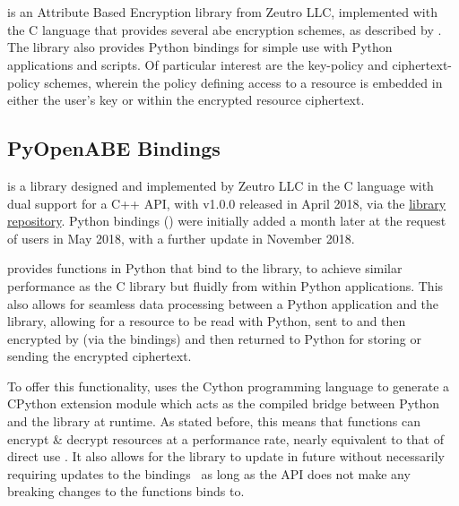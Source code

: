 \section{\OpenABE}
\label{sec:bkgr_openabe}

\OpenABE is an Attribute Based Encryption library from Zeutro LLC, implemented with the C language that provides several \acrshort{abe} encryption schemes, as described by \citet{Akinyele2011}. The library also provides Python bindings for simple use with Python applications and scripts. Of particular interest are the key-policy and ciphertext-policy schemes, wherein the policy defining access to a resource is embedded in either the user's key or within the encrypted resource ciphertext.

\subsection{PyOpenABE Bindings}
\label{subsec:bkgr_pyopenabe}

\OpenABE is a library designed and implemented by Zeutro LLC in the C language with dual support for a C++ API, with v1.0.0 released in April 2018, via the \href{https://github.com/zeutro/openabe/releases}{\OpenABE library repository}. Python bindings (\PyOpenABE) were initially added a month later at the request of users in May 2018, with a further update in November 2018.

\PyOpenABE provides functions in Python that bind to the \OpenABE library, to achieve similar performance as the C library but fluidly from within Python applications. This also allows for seamless data processing between a Python application and the \OpenABE library, allowing for a resource to be read with Python, sent to and then encrypted by \OpenABE (via the \PyOpenABE bindings) and then returned to Python for storing or sending the encrypted ciphertext.

To offer this functionality, \PyOpenABE uses the Cython programming language to generate a CPython extension module which acts as the compiled bridge between Python and the \OpenABE library at runtime. As stated before, this means that \PyOpenABE functions can encrypt \& decrypt resources at a performance rate, nearly equivalent to that of direct \OpenABE use \citep{Akinyele2011}. It also allows for the \OpenABE library to update in future without necessarily requiring updates to the \PyOpenABE bindings \textemdash\ as long as the \OpenABE API does not make any breaking changes to the functions \PyOpenABE binds to.
